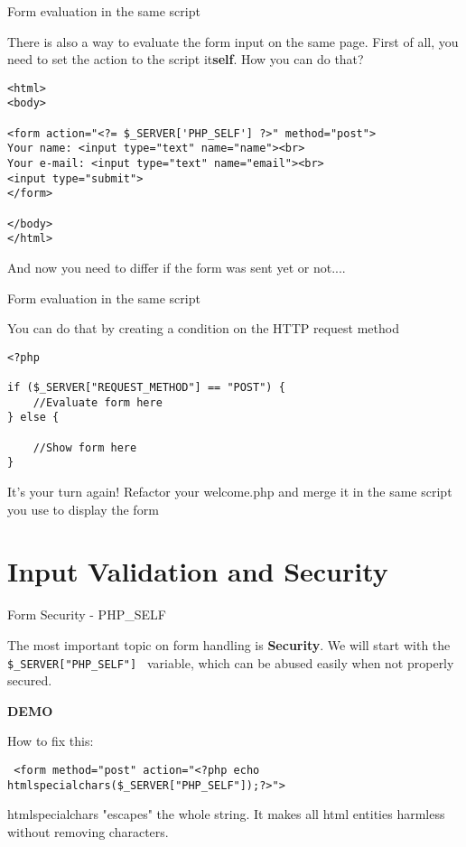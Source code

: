 \begin{frame}[fragile]{Form evaluation in the same script}

	There is also a way to evaluate the form input on the same page. \pause
	First of all, you need to set the action to the script it\textbf{self}. How you can do that? \pause
	
	\begin{lstlisting}
<html>
<body>

<form action="<?= $_SERVER['PHP_SELF'] ?>" method="post">
Your name: <input type="text" name="name"><br>
Your e-mail: <input type="text" name="email"><br>
<input type="submit">
</form>

</body>
</html> 
	\end{lstlisting}
	\pause
	
	And now you need to differ if the form was sent yet or not....
\end{frame}

\begin{frame}[fragile]{Form evaluation in the same script}

	You can do that by creating a condition on the HTTP request method \pause
	
	\begin{lstlisting}
<?php

if ($_SERVER["REQUEST_METHOD"] == "POST") {
	//Evaluate form here
} else {

	//Show form here
}
	\end{lstlisting}
	\pause
	
	It's your turn again! Refactor your welcome.php and merge it in the same script you use to display the form
\end{frame}

\section{Input Validation and Security}


\begin{frame}[fragile]{Form Security - PHP\_{}SELF}

	The most important topic on form handling is \textbf{Security}. \pause
	We will start with the \texttt{\$\_{}SERVER["PHP\_{}SELF"] } variable, which can be abused easily when not properly secured. \pause
	
	\textbf{DEMO} \pause
	
	How to fix this: \pause
	\begin{lstlisting}
 <form method="post" action="<?php echo htmlspecialchars($_SERVER["PHP_SELF"]);?>">
	\end{lstlisting}
	\pause
	
	htmlspecialchars "escapes" the whole string. It makes all html entities harmless without removing characters.
	

\end{frame}

